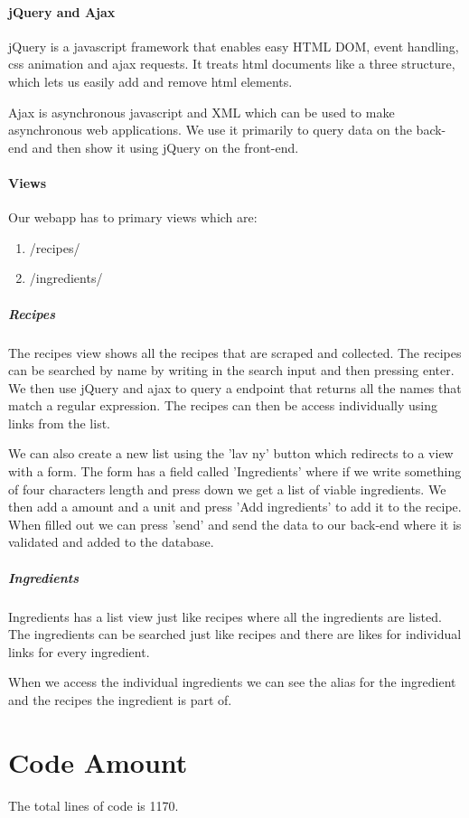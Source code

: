 \documentclass{article}
\begin{document}
\paragraph{jQuery and Ajax}
jQuery is a javascript framework that enables easy HTML DOM, event handling,
css animation and ajax requests. It treats html documents like a three structure,
which lets us easily add and remove html elements. 

Ajax is asynchronous javascript and XML which can be used to make asynchronous
web applications. We use it primarily to query data on the back-end and then show
it using jQuery on the front-end.

\paragraph{Views}
Our webapp has to primary views which are:
\begin{enumerate}
	\item /recipes/
	\item /ingredients/
\end{enumerate}
\subparagraph{Recipes}
The recipes view shows all the recipes that are scraped and collected. The
recipes can be searched by name by writing in the search input and then pressing
enter. We then use jQuery and ajax to query a endpoint that returns all the
names that match a regular expression. The recipes can then be access
individually using links from the list.

We can also create a new list using the 'lav ny' button which redirects to a
view with a form. The form has a field called 'Ingredients' where if we write
something of four characters length and press down we get a list of viable
ingredients. We then add a amount and a unit and press 'Add ingredients' to add
it to the recipe. When filled out we can press 'send' and send the data to our
back-end where it is validated and added to the database.

\subparagraph{Ingredients}
Ingredients has a list view just like recipes where all the ingredients are
listed. The ingredients can be searched just like recipes and there are likes
for individual links for every ingredient.

When we access the individual ingredients we can see the alias for the
ingredient and the recipes the ingredient is part of. 

\appendix

\section{Code Amount}

The total lines of code is 1170.
\end{document}
